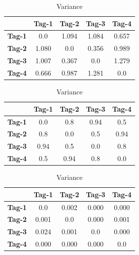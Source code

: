 \begin{table}[ht]
\centering
	\caption{Mean, excpected values and variance of distant measurements, experiment 1.}
\begin{minipage}{0.45\textwidth}
	\begin{tabular}{|c|c c c c|}
		\hline
		& \textbf{Tag-1} & \textbf{Tag-2} & \textbf{Tag-3} & \textbf{Tag-4} \\
		\hline
		\textbf{Tag-1} & 0.0 & 1.094 & 1.084 & 0.657 \\
		\textbf{Tag-2} & 1.080 & 0.0 & 0.356 & 0.989 \\
		\textbf{Tag-3} & 1.007 & 0.367 & 0.0 & 1.279 \\
		\textbf{Tag-4} & 0.666 & 0.987 & 1.281 & 0.0 \\
		\hline
	\end{tabular}
	\caption*{Mean}
\end{minipage}
\hfill
\begin{minipage}{0.45\textwidth}
\centering
	\begin{tabular}{|c|c c c c|}
		\hline
		& \textbf{Tag-1} & \textbf{Tag-2} & \textbf{Tag-3} & \textbf{Tag-4} \\
		\hline
		\textbf{Tag-1} & 0.0 & 0.8 & 0.94 & 0.5 \\
		\textbf{Tag-2} & 0.8 & 0.0 & 0.5 & 0.94 \\
		\textbf{Tag-3} & 0.94 & 0.5 & 0.0 & 0.8 \\
		\textbf{Tag-4} & 0.5 & 0.94 & 0.8 & 0.0 \\
		\hline
	\end{tabular}
	\caption*{Excpected values}
\end{minipage}
\hfill
\begin{minipage}{0.45\textwidth}
	\centering
	\begin{tabular}{|c|c c c c|}
		\hline
		& \textbf{Tag-1} & \textbf{Tag-2} & \textbf{Tag-3} & \textbf{Tag-4} \\
		\hline
		\textbf{Tag-1} & 0.0 & 0.002 & 0.000 & 0.000 \\
		\textbf{Tag-2} & 0.001 & 0.0 & 0.000 & 0.001 \\
		\textbf{Tag-3} & 0.024 & 0.001 & 0.0 & 0.000 \\
		\textbf{Tag-4} & 0.000 & 0.000 & 0.000 & 0.0 \\
		\hline
	\end{tabular}
	\caption*{Variance}
\end{minipage}
\label{t:exp1_dist_var}
\end{table}

